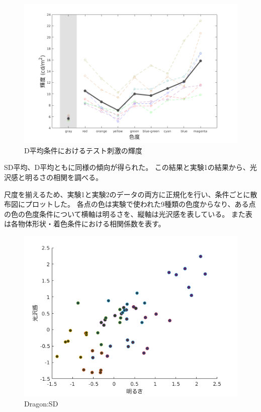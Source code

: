     \begin{figure}
        \centering
        \includegraphics[width=14.0cm]{./img/ex2_res_SD_p.png}
        \caption{D平均条件におけるテスト刺激の輝度}
        \label{ex2_D}
    \end{figure}

    SD平均、D平均ともに同様の傾向が得られた。
    この結果と実験1の結果から、光沢感と明るさの相関を調べる。

    尺度を揃えるため、実験1と実験2のデータの両方に正規化を行い、条件ごとに散布図にプロットした。
    各点の色は実験で使われた9種類の色度からなり、ある点の色の色度条件について横軸は明るさを、縦軸は光沢感を表している。
    また表は各物体形状・着色条件における相関係数を表す。

    \begin{figure}
        \centering
        \includegraphics[width=12.0cm]{./img/ex3_DSD.png}
        \caption{Dragon:SD}
        \label{ex3_DSD}
    \end{figure}

